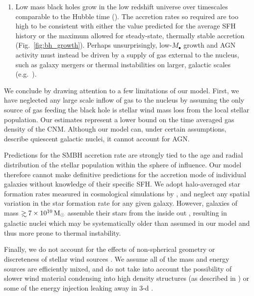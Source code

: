 \documentclass[usenatbib,fleqn]{mn2e}
\newcommand\gsim{\mathrel{\rlap{\lower4pt\hbox{\hskip1pt$\sim$}}
    \raise1pt\hbox{$>$}}}
\begin{document}
\begin{enumerate}
\item Low mass black holes grow in the low redshift universe over
  timescales comparable to the Hubble time (\citealt{Heckman+04}).
  The accretion rates so required are too high to be consistent with
  either the value predicted for the average SFH history or the
  maximum allowed for steady-state, thermally stable accretion
  (Fig.~\ref{fig:bh_growth}).  Perhaps unsurprisingly,
  low-$M_{\bullet}$ growth and AGN activity must instead be driven by
  a supply of gas external to the nucleus, such as galaxy mergers or
  thermal instabilities on larger, galactic scales
  (e.g.~\citealt{Voit+15}).

    

\end{enumerate}
   

We conclude by drawing attention to a few limitations of our model.
First, we have neglected any large scale inflow of gas to the nucleus
by assuming the only source of gas feeding the black hole is stellar
wind mass loss from the local stellar population.  Our estimates
represent a lower bound on the time averaged gas density of the CNM.
Although our model can, under certain assumptions, describe quiescent
galactic nuclei, it cannot account for AGN.

Predictions for the SMBH accretion rate are strongly tied to the age
and radial distribution of the stellar population within the sphere of
influence.  Our model therefore cannot make definitive predictions for
the accretion mode of individual galaxies without knowledge of their
specific SFH.  We adopt halo-averaged star formation rates measured in
cosmological simulations by \citet{MosterNaab+:2013a}, and neglect any
spatial variation in the star formation rate for any given
galaxy. However, galaxies of mass $\gsim 7\times 10^{10} \Msun$
assemble their stars from the inside out
\citep{PerezCidFernandes+:2013a}, resulting in galactic nuclei which
may be systematically older than assumed in our model and thus more
prone to thermal instability.

Finally, we do not account for the effects of non-spherical geometry
or discreteness of stellar wind sources \citep{Cuadra+2006,
  Cuadra+2008}. We assume all of the mass and energy sources are
efficiently mixed, and do not take into account the possibility of
slower wind material condensing into high density structures (as
described in \citealt{Cuadra+2005}) or some of the energy injection
leaking away in 3-d \citep{Harper-Clark+2009,Zubovas+2014}.
\end{document}
